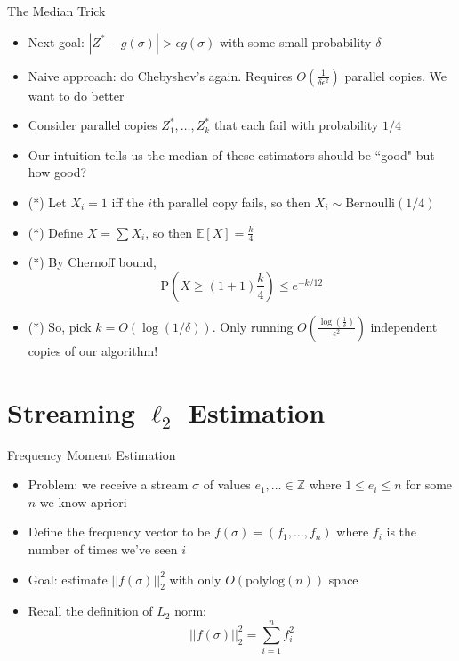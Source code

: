 \documentclass[aspectratio=169]{beamer}
\begin{document}
\begin{frame}{The Median Trick}
\protect\hypertarget{the-median-trick}{}
\begin{itemize}
\tightlist
\item
  Next goal: \(|Z^* - g(\sigma)| > \epsilon g(\sigma)\) with some small
  probability \(\delta\) \pause
\item
  Naive approach: do Chebyshev's again. Requires
  \(O\left(\frac{1}{\delta \epsilon^2} \right)\) parallel copies. We
  want to do better \pause
\item
  Consider parallel copies \(Z^*_1, \dots, Z^*_k\) that each fail with
  probability \(1/4\) \pause
\item
  Our intuition tells us the median of these estimators should be
  ``good" but how good? \pause
\item
  (*) Let \(X_i = 1\) iff the \(i\)th parallel copy fails, so then
  \(X_i \sim \text{Bernoulli}(1/4)\) \pause
\item
  (*) Define \(X = \sum X_i\), so then \(\mathbb{E}[X] = \frac{k}{4}\) \pause
\item
  (*) By Chernoff bound,
  \[\text{P}\left(X \geq (1+1)\frac{k}{4}\right) \leq e^{-k/12}\] \pause
\item
  (*) So, pick \(k = O(\log(1/\delta))\). Only running
  \(O\left(\frac{\log\left(\frac{1}{\delta}\right)}{\epsilon^2}\right)\)
  independent copies of our algorithm!
\end{itemize}
\end{frame}

\section{Streaming $\ell_2$ Estimation}

\frame{\sectionpage}

\begin{frame}{Frequency Moment Estimation}
\protect\hypertarget{frequency-moment-estimation}{}
\begin{itemize}
\tightlist
\item
  Problem: we receive a stream \(\sigma\) of values
  \(e_1,\dots \in \mathbb{Z}\) where \(1 \leq e_i \leq n\) for some
  \(n\) we know apriori \pause
\item
  Define the frequency vector to be \(f(\sigma) = (f_1,\dots,f_n)\)
  where \(f_i\) is the number of times we've seen \(i\) \pause
\item
  Goal: estimate \(||f(\sigma)||_2^2\) with only
  \(O(\text{polylog}(n))\) space \pause
\item
  Recall the definition of \(L_2\) norm:
  \[||f(\sigma)||_2^2 = \sum_{i=1}^n f_i^2\]
\end{itemize}
\end{frame}
\end{document}
